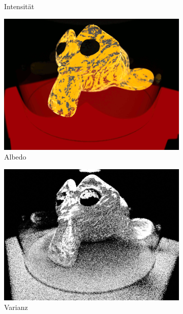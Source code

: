 \begin{figure}[!b]
\begin{subfigure}{0.32\linewidth}
				\caption{Intensität}
			\end{subfigure}
			\begin{subfigure}{0.32\linewidth}
				\includegraphics[width=\linewidth]{Medien/suzanne-albedo}
				\caption{Albedo}
			\end{subfigure}
			\begin{subfigure}{0.32\linewidth}
				\includegraphics[width=\linewidth]{Medien/suzanne-variance}
				\caption{Varianz}
			\end{subfigure}
			\hfill
			\begin{subfigure}{0.32\linewidth}

\end{subfigure}
\end{figure}
